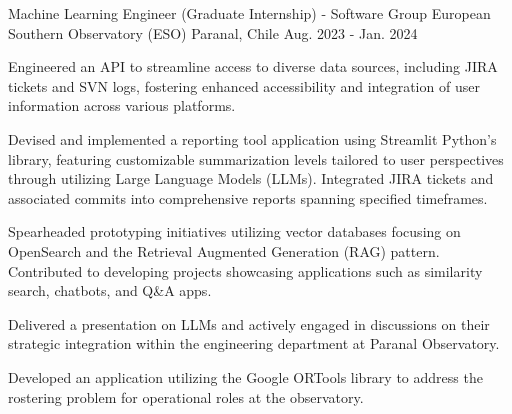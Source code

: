 

\begin{cventries}
  \cventry
    {Machine Learning Engineer (Graduate Internship) - Software Group} %
    {European Southern Observatory (ESO)} %
    {Paranal, Chile} %
    {Aug. 2023 - Jan. 2024} %
    {
      \begin{cvitems} %
        \item {Engineered an API to streamline access to diverse data sources, including JIRA tickets and SVN logs, fostering enhanced accessibility and integration of user information across various platforms.}
        \item {Devised and implemented a reporting tool application using Streamlit Python's library, featuring customizable summarization levels tailored to user perspectives through utilizing Large Language Models (LLMs). Integrated JIRA tickets and associated commits into comprehensive reports spanning specified timeframes.}
	\item {Spearheaded prototyping initiatives utilizing vector databases focusing on OpenSearch and the Retrieval Augmented Generation (RAG) pattern. Contributed to developing projects showcasing applications such as similarity search, chatbots, and Q\&A apps.}
	\item {Delivered a presentation on LLMs and actively engaged in discussions on their strategic integration within the engineering department at Paranal Observatory.}
	\item {Developed an application utilizing the Google ORTools library to address the rostering problem for operational roles at the observatory.}
      \end{cvitems}
    }


\end{cventries}
